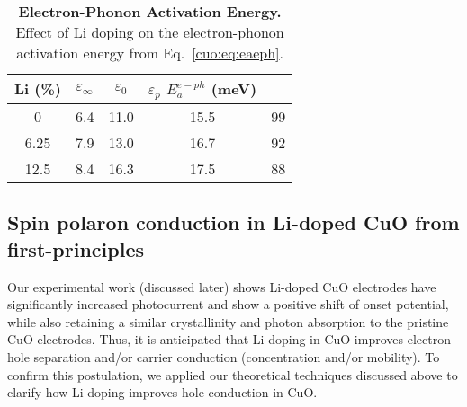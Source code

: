 \begin{table}[H]
    \footnotesize
    \centering
    \begin{tabular}{ccccc}
    \hline \hline
    Li (\%) & $\varepsilon_\infty$ & $\varepsilon_0$ & $\varepsilon_p$ $E_a^{e-ph}$ (meV) \\
    \hline
    0         & 6.4  & 11.0  & 15.5  & 99 \\
    6.25      & 7.9  & 13.0  & 16.7  & 92 \\
    12.5      & 8.4  & 16.3  & 17.5  & 88 \\
    \hline \hline
    \end{tabular}
    \caption{\textbf{Electron-Phonon Activation Energy.} Effect of Li doping on the electron-phonon activation energy from Eq.~\ref{cuo:eq:eaeph}.}
    \label{cuo:table:eph}
\end{table}

\subsection{Spin polaron conduction in Li-doped CuO from first-principles}
Our experimental work (discussed later) shows Li-doped CuO electrodes have significantly increased photocurrent and show a positive shift of onset potential, while also retaining a similar crystallinity and photon absorption to the pristine CuO electrodes. Thus, it is anticipated that Li doping in CuO improves electron-hole separation and/or carrier conduction (concentration and/or mobility). To confirm this postulation, we applied our theoretical techniques discussed above to clarify how Li doping improves hole conduction in CuO.

